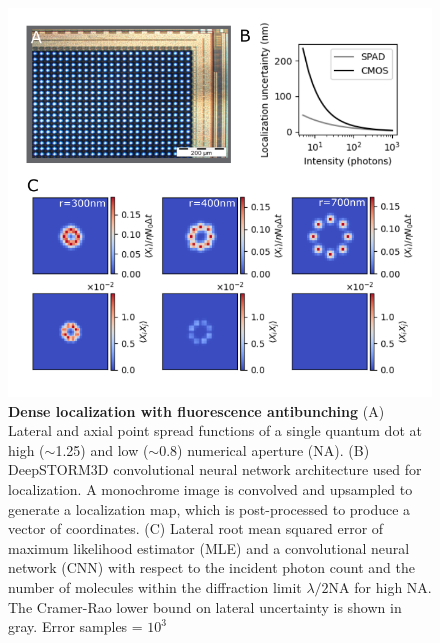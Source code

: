 \documentclass{ucetd}
\begin{document}
\begin{figure}
\begin{center}
\includegraphics[width=13cm]{Antibunching-Full.png}
\end{center}
\caption{\textbf{Dense localization with fluorescence antibunching} (A) Lateral and axial point spread functions of a single quantum dot at high ($\sim$1.25) and low ($\sim$0.8) numerical aperture (NA). (B) DeepSTORM3D convolutional neural network architecture used for localization. A monochrome image is convolved and upsampled to generate a localization map, which is post-processed to produce a vector of coordinates. (C) Lateral root mean squared error of maximum likelihood estimator (MLE) and a convolutional neural network (CNN) with respect to the incident photon count and the number of molecules within the diffraction limit $\lambda/2\mathrm{NA}$ for high NA. The Cramer-Rao lower bound on lateral uncertainty is shown in gray. Error samples = $10^{3}$}
\end{figure}
\end{document}

